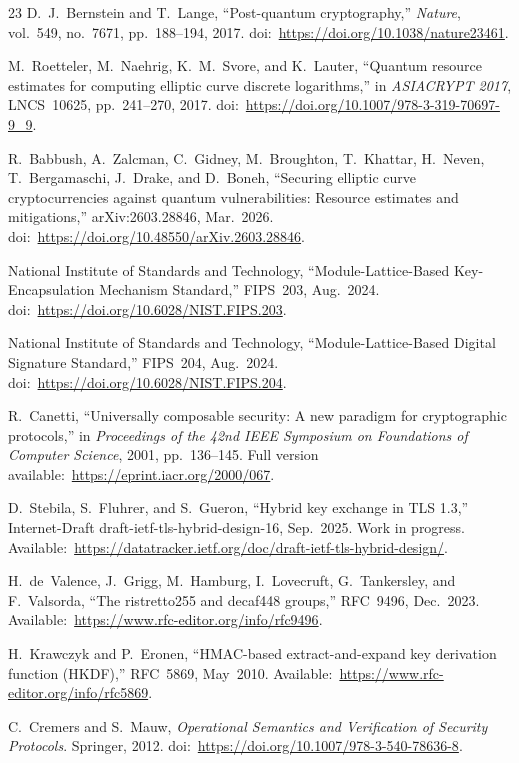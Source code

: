 \documentclass[conference]{IEEEtran}
\begin{document}
\begin{thebibliography}{23}
D.~J.~Bernstein and T.~Lange, ``Post-quantum cryptography,'' \emph{Nature}, vol.~549, no.~7671, pp.~188--194, 2017. doi:~\url{https://doi.org/10.1038/nature23461}.

M.~Roetteler, M.~Naehrig, K.~M.~Svore, and K.~Lauter, ``Quantum resource estimates for computing elliptic curve discrete logarithms,'' in \emph{ASIACRYPT 2017}, LNCS~10625, pp.~241--270, 2017. doi:~\url{https://doi.org/10.1007/978-3-319-70697-9_9}.

R.~Babbush, A.~Zalcman, C.~Gidney, M.~Broughton, T.~Khattar,
H.~Neven, T.~Bergamaschi, J.~Drake, and D.~Boneh,
``Securing elliptic curve cryptocurrencies against quantum vulnerabilities:
Resource estimates and mitigations,'' arXiv:2603.28846, Mar.~2026.
doi:~\url{https://doi.org/10.48550/arXiv.2603.28846}.

National Institute of Standards and Technology, ``Module-Lattice-Based Key-Encapsulation Mechanism Standard,'' FIPS~203, Aug.~2024. doi:~\url{https://doi.org/10.6028/NIST.FIPS.203}.

National Institute of Standards and Technology, ``Module-Lattice-Based Digital Signature Standard,'' FIPS~204, Aug.~2024. doi:~\url{https://doi.org/10.6028/NIST.FIPS.204}.

R.~Canetti, ``Universally composable security: A new paradigm for cryptographic protocols,'' in \emph{Proceedings of the 42nd IEEE Symposium on Foundations of Computer Science}, 2001, pp.~136--145. Full version available:~\url{https://eprint.iacr.org/2000/067}.

D.~Stebila, S.~Fluhrer, and S.~Gueron, ``Hybrid key exchange in TLS 1.3,'' Internet-Draft draft-ietf-tls-hybrid-design-16, Sep.~2025. Work in progress. Available:~\url{https://datatracker.ietf.org/doc/draft-ietf-tls-hybrid-design/}.

H.~de~Valence, J.~Grigg, M.~Hamburg, I.~Lovecruft, G.~Tankersley, and F.~Valsorda, ``The ristretto255 and decaf448 groups,'' RFC~9496, Dec.~2023. Available:~\url{https://www.rfc-editor.org/info/rfc9496}.

H.~Krawczyk and P.~Eronen, ``HMAC-based extract-and-expand key derivation function (HKDF),'' RFC~5869, May~2010. Available:~\url{https://www.rfc-editor.org/info/rfc5869}.

C.~Cremers and S.~Mauw, \emph{Operational Semantics and Verification of Security Protocols}. Springer, 2012. doi:~\url{https://doi.org/10.1007/978-3-540-78636-8}.


\end{thebibliography}
\end{document}
